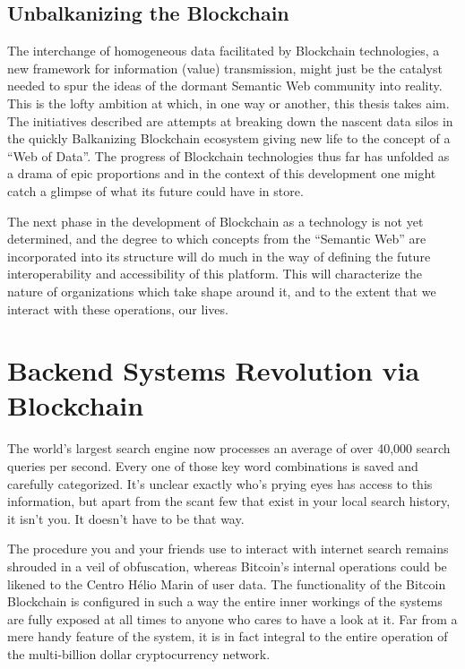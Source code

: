 \subsection*{Unbalkanizing the Blockchain}

The interchange of homogeneous data facilitated by Blockchain technologies, a new framework for information (value) transmission, might just be the catalyst needed to spur the ideas of the dormant Semantic Web community into reality. 
This is the lofty ambition at which, in one way or another, this thesis takes aim.
The initiatives described are attempts at breaking down the nascent data silos in the quickly Balkanizing Blockchain ecosystem giving new life to the concept of a ``Web of Data''.
The progress of Blockchain technologies thus far has unfolded as a drama of epic proportions and in the context of this development one might catch a glimpse of what its future could have in store.

The next phase in the development of Blockchain as a technology is not yet determined, and the degree to which concepts from the ``Semantic Web'' are incorporated into its structure will do much in the way of defining the future interoperability and accessibility of this platform. 
This will characterize the nature of organizations which take shape around it, and to the extent that we interact with these operations, our lives.


\section{Backend Systems Revolution via Blockchain}

The world's largest search engine now processes an average of over 40,000 search queries per second. Every one of those key word combinations is saved and carefully categorized. It's unclear exactly who's prying eyes has access to this information, but apart from the scant few that exist in your local search history, it isn't you. 
It doesn't have to be that way.

The procedure you and your friends use to interact with internet search remains shrouded in a veil of obfuscation, whereas Bitcoin's internal operations could be likened to the Centro H\'{e}lio Marin of user data. 
The functionality of the Bitcoin Blockchain is configured in such a way the entire inner workings of the systems are fully exposed at all times to anyone who cares to have a look at it.
Far from a mere handy feature of the system, it is in fact integral to the entire operation of the multi-billion dollar cryptocurrency network.

